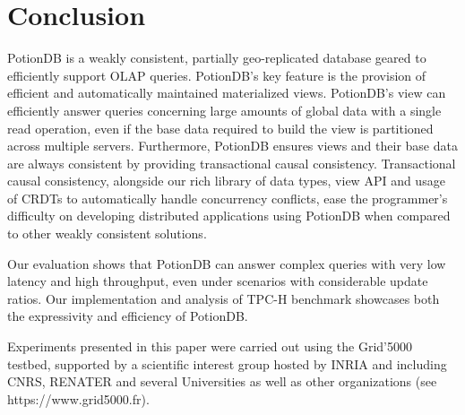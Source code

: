 \documentclass[sigconf, nonacm]{acmart}
\begin{document}

\section{Conclusion}
\label{sec:conclusion}

PotionDB is a weakly consistent, partially geo-replicated database geared to efficiently support OLAP queries.
PotionDB’s key feature is the provision of efficient and automatically maintained materialized views.
PotionDB’s view can efficiently answer queries concerning large amounts of global data with a single read operation, even if the base data required to build the view is partitioned across multiple servers.
Furthermore, PotionDB ensures views and their base data are always consistent by providing transactional causal consistency.
Transactional causal consistency, alongside our rich library of data types, view API and usage of CRDTs to automatically handle concurrency conflicts, ease the programmer’s difficulty on developing distributed applications using PotionDB when compared to other weakly consistent solutions.

Our evaluation shows that PotionDB can answer complex queries with very low latency and high throughput, even under scenarios with considerable update ratios.
Our implementation and analysis of TPC-H benchmark showcases both the expressivity and efficiency of PotionDB.


\begin{acks}
Experiments presented in this paper were carried out using the Grid'5000 testbed, supported by a scientific interest group hosted by INRIA and including CNRS, RENATER and several Universities as well as other organizations (see https://www.grid5000.fr).
\end{acks}
\end{document}

